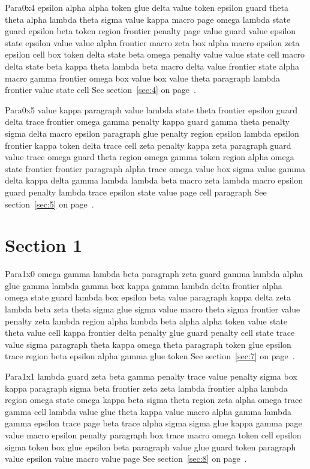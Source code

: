 \documentclass{article}
\begin{document}
Para0x4 epsilon alpha alpha token glue delta value token epsilon guard theta theta alpha lambda theta sigma value kappa macro page omega lambda state guard epsilon beta token region frontier penalty page value guard value epsilon state epsilon value value alpha frontier macro zeta box alpha macro epsilon zeta epsilon cell box token delta state beta omega penalty value value state cell macro delta state beta kappa theta lambda beta macro delta value frontier state alpha macro gamma frontier omega box value box value theta paragraph lambda frontier value state cell See section~\ref{sec:4} on page~\pageref{sec:4}.

Para0x5 value kappa paragraph value lambda state theta frontier epsilon guard delta trace frontier omega gamma penalty kappa guard gamma theta penalty sigma delta macro epsilon paragraph glue penalty region epsilon lambda epsilon frontier kappa token delta trace cell zeta penalty kappa zeta paragraph guard value trace omega guard theta region omega gamma token region alpha omega state frontier frontier paragraph alpha trace omega value box sigma value gamma delta kappa delta gamma lambda lambda beta macro zeta lambda macro epsilon guard penalty lambda trace epsilon state value page cell paragraph See section~\ref{sec:5} on page~\pageref{sec:5}.

\section{Section 1}\label{sec:1}
Para1x0 omega gamma lambda beta paragraph zeta guard gamma lambda alpha glue gamma lambda gamma box kappa gamma lambda delta frontier alpha omega state guard lambda box epsilon beta value paragraph kappa delta zeta lambda beta zeta theta sigma glue sigma value macro theta sigma frontier value penalty zeta lambda region alpha lambda beta alpha alpha token value state theta value cell kappa frontier delta penalty glue guard penalty cell state trace value sigma paragraph theta kappa omega theta paragraph token glue epsilon trace region beta epsilon alpha gamma glue token See section~\ref{sec:7} on page~\pageref{sec:3}.

Para1x1 lambda guard zeta beta gamma penalty trace value penalty sigma box kappa paragraph sigma beta frontier zeta zeta lambda frontier alpha lambda region omega state omega kappa beta sigma theta region zeta alpha omega trace gamma cell lambda value glue theta kappa value macro alpha gamma lambda gamma epsilon trace page beta trace alpha sigma sigma glue kappa gamma page value macro epsilon penalty paragraph box trace macro omega token cell epsilon sigma token box glue epsilon beta paragraph value glue guard token paragraph value epsilon value macro value page See section~\ref{sec:8} on page~\pageref{sec:4}.
\end{document}
